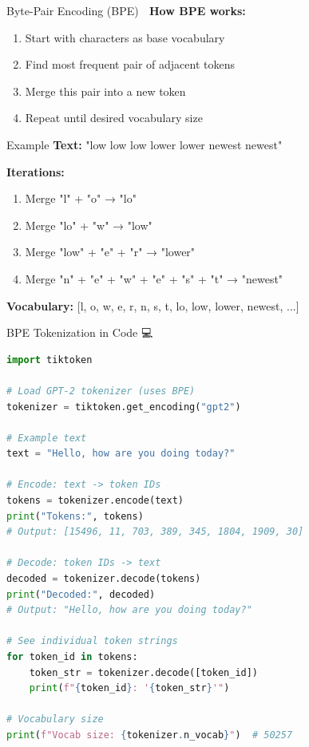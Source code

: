 \documentclass[aspectratio=169]{beamer}
\begin{document}
\begin{frame}[shrink=10]{Byte-Pair Encoding (BPE) 🧩}
    \textbf{How BPE works:}

    \vspace{0.3cm}

    \begin{enumerate}\setlength{\itemsep}{0pt}
        \item Start with characters as base vocabulary
        \item Find most frequent pair of adjacent tokens
        \item Merge this pair into a new token
        \item Repeat until desired vocabulary size
    \end{enumerate}

    \vspace{0.3cm}

    \begin{block}{Example}
        \small
        \textbf{Text:} "low low low lower lower newest newest"

        \vspace{0.3cm}

        \textbf{Iterations:}
        \begin{enumerate}\setlength{\itemsep}{0pt}
            \item Merge "l" + "o" → "lo"
            \item Merge "lo" + "w" → "low"
            \item Merge "low" + "e" + "r" → "lower"
            \item Merge "n" + "e" + "w" + "e" + "s" + "t" → "newest"
        \end{enumerate}

        \vspace{0.3cm}

        \textbf{Vocabulary:} [l, o, w, e, r, n, s, t, lo, low, lower, newest, ...]
    \end{block}
\end{frame}

\begin{frame}[fragile]{BPE Tokenization in Code 💻}
\begin{lstlisting}[language=Python]
import tiktoken

# Load GPT-2 tokenizer (uses BPE)
tokenizer = tiktoken.get_encoding("gpt2")

# Example text
text = "Hello, how are you doing today?"

# Encode: text -> token IDs
tokens = tokenizer.encode(text)
print("Tokens:", tokens)
# Output: [15496, 11, 703, 389, 345, 1804, 1909, 30]

# Decode: token IDs -> text
decoded = tokenizer.decode(tokens)
print("Decoded:", decoded)
# Output: "Hello, how are you doing today?"

# See individual token strings
for token_id in tokens:
    token_str = tokenizer.decode([token_id])
    print(f"{token_id}: '{token_str}'")

# Vocabulary size
print(f"Vocab size: {tokenizer.n_vocab}")  # 50257
\end{lstlisting}
\end{frame}
\end{document}
